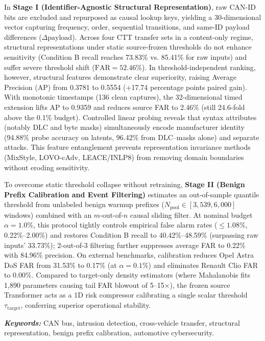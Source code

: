 \documentclass[12pt, a4paper, reqno, oneside]{book}
\begin{document}
In \textbf{Stage I (Identifier-Agnostic Structural Representation)}, raw CAN-ID bits are excluded and repurposed as causal lookup keys, yielding a 30-dimensional vector capturing frequency, order, sequential transitions, and same-ID payload differences ($\Delta\text{payload}$). Across four CTT transfer sets in a content-only regime, structural representations under static source-frozen thresholds do not enhance sensitivity (Condition B recall reaches 73.83\% vs. 85.41\% for raw inputs) and suffer severe threshold shift ($\text{FAR} = 52.46\%$). In threshold-independent ranking, however, structural features demonstrate clear superiority, raising Average Precision (AP) from 0.3781 to 0.5554 (+17.74 percentage points paired gain). With monotonic timestamps (136 clean captures), the 32-dimensional timed extension lifts AP to 0.9359 and reduces source FAR to 2.46\% (still 24.6-fold above the 0.1\% budget). Controlled linear probing reveals that syntax attributes (notably DLC and byte masks) simultaneously encode manufacturer identity (94.88\% probe accuracy on latents, 96.42\% from DLC--masks alone) and separate attacks. This feature entanglement prevents representation invariance methods (MixStyle, LOVO-cAdv, LEACE/INLP8) from removing domain boundaries without eroding sensitivity.

To overcome static threshold collapse without retraining, \textbf{Stage II (Benign Prefix Calibration and Event Filtering)} estimates an out-of-sample quantile threshold from unlabeled benign warmup prefixes ($N_{\text{pool}} \in [3{,}539, 6{,}000]$ windows) combined with an $m$-out-of-$n$ causal sliding filter. At nominal budget $\alpha = 1.0\%$, this protocol tightly controls empirical false alarm rates ($\le 1.08\%$, 0.22\%--2.00\%) and restores Condition B recall to 40.42\%--48.59\% (surpassing raw inputs' 33.73\%); 2-out-of-3 filtering further suppresses average FAR to 0.22\% with 84.96\% precision. On external benchmarks, calibration reduces Opel Astra DoS FAR from 31.53\% to 0.17\% (at $\alpha = 0.1\%$) and eliminates Renault Clio FAR to 0.00\%. Compared to target-only density estimators (where Mahalanobis fits 1,890 parameters causing tail FAR blowout of 5--15$\times$), the frozen source Transformer acts as a 1D risk compressor calibrating a single scalar threshold $\tau_{\text{target}}$, conferring superior operational stability.

\smallskip
\noindent \textit{\textbf{Keywords:}} CAN bus, intrusion detection, cross-vehicle transfer, structural representation, benign prefix calibration, automotive cybersecurity.
\newpage
\end{document}
